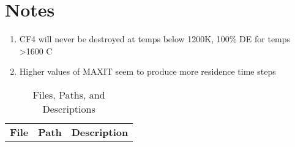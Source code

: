 \documentclass{article}
\begin{document}
\section*{Notes}
\begin{enumerate}
    \item CF4 will never be destroyed at temps below 1200K, 100\% DE for temps >1600 C
    \item Higher values of MAXIT seem to produce more residence time steps
\end{enumerate}
\pagebreak
\begin{table}[H] %
\centering
\renewcommand{\arraystretch}{1.256}
\caption{Files, Paths, and Descriptions}
\begin{tabular}{>{\centering\arraybackslash}m{}>{\scriptsize\centering\arraybackslash}m{}>{\footnotesize\centering\arraybackslash}m{}}\toprule

\normalsize{\textbf{File}} & \normalsize{\textbf{Path}} & \normalsize{\textbf{Description}} \\\cmidrule(r){1-1}\cmidrule(lr){2-2}\cmidrule(l){3-3}


\end{tabular}
\end{table}
\end{document}
